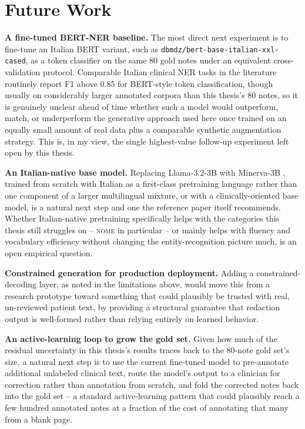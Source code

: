 \documentclass[12pt,a4paper]{report}
\newcommand{\NOME}{\textsc{nome}}
\begin{document}
\section{Future Work}
\label{sec:future-work}

\textbf{A fine-tuned BERT-NER baseline.} The most direct next experiment is to fine-tune an Italian BERT variant, such as \texttt{dbmdz/bert-base-italian-xxl-cased}, as a token classifier on the same 80 gold notes under an equivalent cross-validation protocol. Comparable Italian clinical NER tasks in the literature routinely report F1 above 0.85 for BERT-style token classification, though usually on considerably larger annotated corpora than this thesis's 80 notes, so it is genuinely unclear ahead of time whether such a model would outperform, match, or underperform the generative approach used here once trained on an equally small amount of real data plus a comparable synthetic augmentation strategy. This is, in my view, the single highest-value follow-up experiment left open by this thesis.

\textbf{An Italian-native base model.} Replacing Llama-3.2-3B with Minerva-3B \citep{orlando2024minerva}, trained from scratch with Italian as a first-class pretraining language rather than one component of a larger multilingual mixture, or with a clinically-oriented base model, is a natural next step and one the reference paper itself recommends. Whether Italian-native pretraining specifically helps with the categories this thesis still struggles on -- \NOME{} in particular -- or mainly helps with fluency and vocabulary efficiency without changing the entity-recognition picture much, is an open empirical question.

\textbf{Constrained generation for production deployment.} Adding a constrained-decoding layer, as noted in the limitations above, would move this from a research prototype toward something that could plausibly be trusted with real, un-reviewed patient text, by providing a structural guarantee that redaction output is well-formed rather than relying entirely on learned behavior.

\textbf{An active-learning loop to grow the gold set.} Given how much of the residual uncertainty in this thesis's results traces back to the 80-note gold set's size, a natural next step is to use the current fine-tuned model to pre-annotate additional unlabeled clinical text, route the model's output to a clinician for correction rather than annotation from scratch, and fold the corrected notes back into the gold set -- a standard active-learning pattern that could plausibly reach a few hundred annotated notes at a fraction of the cost of annotating that many from a blank page.
\end{document}
